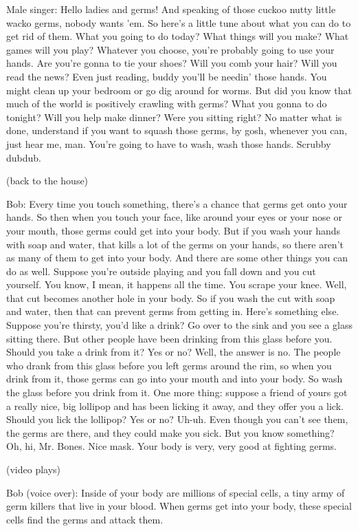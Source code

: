 Male singer: Hello ladies and germs! And speaking of those cuckoo nutty little wacko germs, nobody wants 'em. So here's a little tune about what you can do to get rid of them. What you going to do today? What things will you make? What games will you play? Whatever you choose, you're probably going to use your hands. Are you're gonna to tie your shoes? Will you comb your hair? Will you read the news? Even just reading, buddy you'll be needin' those hands. You might clean up your bedroom or go dig around for worms. But did you know that much of the world is positively crawling with germs? What you gonna to do tonight? Will you help make dinner? Were you sitting right? No matter what is done, understand if you want to squash those germs, by gosh, whenever you can, just hear me, man. You're going to have to wash, wash those hands. Scrubby dubdub.

(back to the house)

Bob: Every time you touch something, there's a chance that germs get onto your hands. So then when you touch your face, like around your eyes or your nose or your mouth, those germs could get into your body. But if you wash your hands with soap and water, that kills a lot of the germs on your hands, so there aren't as many of them to get into your body. And there are some other things you can do as well. Suppose you're outside playing and you fall down and you cut yourself. You know, I mean, it happens all the time. You scrape your knee. Well, that cut becomes another hole in your body. So if you wash the cut with soap and water, then that can prevent germs from getting in. Here's something else. Suppose you're thirsty, you'd like a drink? Go over to the sink and you see a glass sitting there. But other people have been drinking from this glass before you. Should you take a drink from it? Yes or no? Well, the answer is no. The people who drank from this glass before you left germs around the rim, so when you drink from it, those germs can go into your mouth and into your body. So wash the glass before you drink from it. One more thing: suppose a friend of yours got a really nice, big lollipop and has been licking it away, and they offer you a lick. Should you lick the lollipop? Yes or no? Uh-uh. Even though you can't see them, the germs are there, and they could make you sick. But you know something? Oh, hi, Mr. Bones. Nice mask. Your body is very, very good at fighting germs.

(video plays)

Bob (voice over): Inside of your body are millions of special cells, a tiny army of germ killers that live in your blood. When germs get into your body, these special cells find the germs and attack them.

